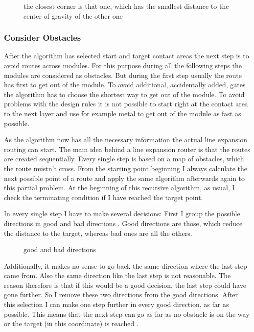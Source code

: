 \begin{figure}
	\centering
	
  	\caption{the closest corner is that one, which has the smallest distance to the center of gravity of the other one}
	\label{fig:rectangles_closest_corner}
\end{figure}

\subsubsection{Consider Obstacles}
After the algorithm has selected start and target contact areas the next step is to avoid routes across modules. For this purpose during all the following steps the modules are considered as obstacles. But during the first step usually the route has first to get out of the module. To avoid additional, accidentally added, gates the algorithm has to choose the shortest way to get out of the module. To avoid problems with the design rules it is not possible to start right at the contact area to the next layer and use for example metal to get out of the module as fast as possible.

As the algorithm now has all the necessary information the actual line expansion routing can start. The main idea behind a line expansion router is that the routes are created sequentially. Every single step is based on a map of obstacles, which the route mustn't cross. From the starting point beginning I always calculate the next possible point of a route and apply the same algorithm afterwards again to this partial problem. At the beginning of this recursive algorithm, as usual, I check the terminating condition if I have reached the target point.

In every single step I have to make several decisions: First I group the possible directions in good and bad directions . Good directions are those, which reduce the distance to the target, whereas bad ones are all the others.

\begin{figure}
	\centering
	
  	\caption{good and bad directions}
	\label{fig:router_good_bad_direction}
\end{figure}

Additionally, it makes no sense to go back the same direction where the last step came from. Also the same direction like the last step is not reasonable. The reason therefore is that if this would be a good decision, the last step could have gone further. So I remove these two directions from the good directions. After this selection I can make one step further in every good direction, as far as possible. This means that the next step can go as far as no obstacle is on the way or the target (in this coordinate) is reached .


